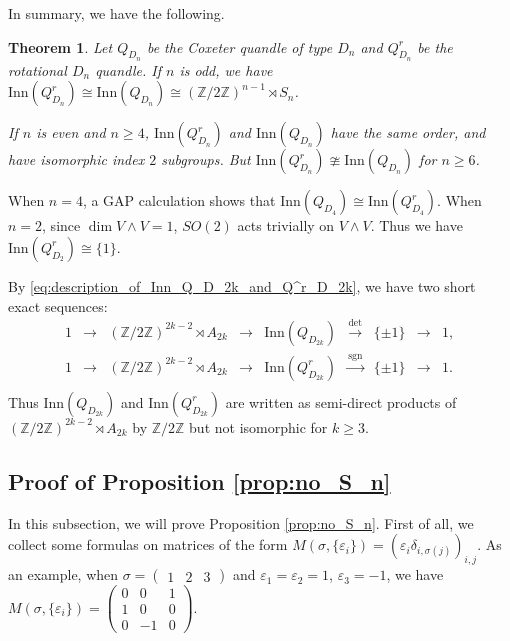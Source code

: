 \documentclass{amsart}
\newtheorem{theorem}{Theorem}[section]
\theoremstyle{definition}
\theoremstyle{remark}
\numberwithin{equation}{section}
\begin{document}
In summary, we have the following.
\begin{theorem}
\label{thm:inner_automorphism_group_of_Q^r_D_n}
Let $Q_{D_n}$ be the Coxeter quandle of type $D_n$ and 
$Q^r_{D_n}$ be the rotational $D_n$ quandle.
If $n$ is odd, we have $\mathrm{Inn} (Q^r_{D_n}) \cong \mathrm{Inn} (Q_{D_n})
\cong (\mathbb{Z}/2 \mathbb{Z})^{n-1} \rtimes S_n$.

If $n$ is even and $n \geq 4$, $\mathrm{Inn} (Q^r_{D_n})$ and $\mathrm{Inn} (Q_{D_n})$ 
have the same order, and have isomorphic index $2$ subgroups.
But $\mathrm{Inn} (Q^r_{D_n}) \ncong \mathrm{Inn} (Q_{D_n})$ for $n \geq 6$.
\end{theorem}

When $n = 4$, a GAP calculation shows that 
$\mathrm{Inn}(Q_{D_{4}}) \cong  \mathrm{Inn}(Q^r_{D_{4}})$.
When $n = 2$, since $\dim V \wedge V = 1$, $SO(2)$ acts trivially on $V \wedge V$.
Thus we have $\mathrm{Inn} (Q^r_{D_2}) \cong \{1 \}$.

By \ref{eq:description_of_Inn_Q_D_2k_and_Q^r_D_2k}, 
we have two short exact sequences:
\[
\begin{array}{ccccccccc}
1 & \to & (\mathbb{Z} / 2 \mathbb{Z})^{2k-2} \rtimes A_{2k}
& \to & \mathrm{Inn}(Q_{D_{2k}}) & \xrightarrow{\mathrm{det}} & \{ \pm 1 \} & \to & 1 ,  \\
1 & \to & (\mathbb{Z} / 2 \mathbb{Z})^{2k-2} \rtimes A_{2k}
& \to & \mathrm{Inn}(Q^r_{D_{2k}}) & \xrightarrow{\mathrm{sgn}} & \{ \pm 1 \} & \to & 1 .  \\
\end{array}
\]
Thus $\mathrm{Inn}(Q_{D_{2k}})$ and $\mathrm{Inn}(Q^r_{D_{2k}})$ are written as 
semi-direct products of $(\mathbb{Z} / 2 \mathbb{Z})^{2k-2} \rtimes A_{2k}$ by 
$\mathbb{Z}/2\mathbb{Z}$ but not isomorphic for $k \geq 3$. 

\subsection{Proof of Proposition \ref{prop:no_S_n}}
\label{subsec:proof_of_no_S_n}
In this subsection, we will prove Proposition \ref{prop:no_S_n}.
First of all, we collect some formulas on matrices of the form
$M(\sigma, \{ \varepsilon_i \} ) = (\varepsilon_i \delta_{i, \sigma(j)})_{i, j}$.
As an example, when $\sigma = \begin{pmatrix} 1 & 2 & 3 \end{pmatrix}$ and 
$\varepsilon_1 = \varepsilon_2 = 1$, $\varepsilon_3 = -1$, we have
$M(\sigma, \{ \varepsilon_i \} ) 
= \begin{pmatrix} 
0 & 0 & 1 \\ 
1 & 0 & 0 \\ 
0 & -1 & 0 
\end{pmatrix}$.
\end{document}
